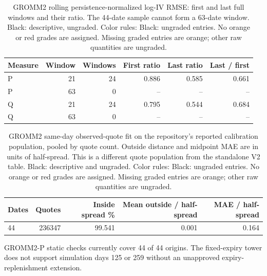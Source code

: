 \documentclass[11pt]{article}
\begin{document}
\begin{table}[H]\centering\small\setlength{\tabcolsep}{4pt}
\caption{GROMM2 rolling persistence-normalized log-IV RMSE: first and last full windows and their ratio. The 44-date sample cannot form a 63-date window. Black: descriptive, ungraded. Color rules: Black: ungraded entries. No orange or red grades are assigned. Missing graded entries are orange; other raw quantities are ungraded.}\label{tab:gromm2-rolling}
\begin{tabular}{@{}lrrrrr@{}}
\toprule
Measure & Window & Windows & First ratio & Last ratio & Last / first \\
\midrule
P & 21 & 24 & 0.886 & 0.585 & 0.661 \\
P & 63 & 0 & -- & -- & -- \\
Q & 21 & 24 & 0.795 & 0.544 & 0.684 \\
Q & 63 & 0 & -- & -- & -- \\
\bottomrule\end{tabular}\end{table}

\begin{table}[H]\centering\small\setlength{\tabcolsep}{4pt}
\caption{GROMM2 same-day observed-quote fit on the repository's reported calibration population, pooled by quote count. Outside distance and midpoint MAE are in units of half-spread. This is a different quote population from the standalone V2 table. Black: descriptive and ungraded. Color rules: Black: ungraded entries. No orange or red grades are assigned. Missing graded entries are orange; other raw quantities are ungraded.}\label{tab:gromm2-same-day-fit}
\begin{tabular}{@{}lrrrr@{}}
\toprule
Dates & Quotes & Inside spread \% & Mean outside / half-spread & MAE / half-spread \\
\midrule
44 & 236347 & 99.541 & 0.001 & 0.164 \\
\bottomrule\end{tabular}\end{table}

GROMM2-P static checks currently cover 44 of 44 origins. The fixed-expiry tower does not support simulation days 125 or 259 without an unapproved expiry-replenishment extension.
\end{document}
